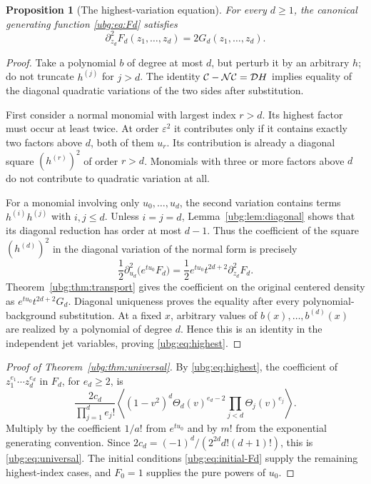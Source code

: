 \documentclass[11pt,letterpaper]{article}
\numberwithin{equation}{section}
\newtheorem{proposition}[theorem]{Proposition}
\theoremstyle{definition}\newtheorem{definition}[theorem]{Definition}
\theoremstyle{remark}\newtheorem{remark}[theorem]{Remark}
\newcommand{\D}{\mathcal D}\newcommand{\NF}{\mathcal N}\newcommand{\HF}{\mathcal H}
\newcommand{\av}[1]{\left\langle #1\right\rangle}
\begin{document}
\begin{proposition}[The highest-variation equation]
\label{ubg:prop:highest}
For every $d\ge1$, the canonical generating function
\eqref{ubg:eq:Fd} satisfies
\begin{equation}\label{ubg:eq:highest}
 \boxed{\displaystyle
 \partial_{z_d}^2F_d(z_1,\ldots,z_d)=2G_d(z_1,\ldots,z_d).}
\end{equation}
\end{proposition}
\begin{proof}
Take a polynomial $b$ of degree at most $d$, but perturb it by an
arbitrary $h$; do not truncate $h^{(j)}$ for $j>d$.
The identity $\CC-\NF\CC=\D H$ implies equality of the diagonal
quadratic variations of the two sides after substitution.

First consider a normal monomial with largest index $r>d$.
Its highest factor must occur at least twice. At order $\varepsilon^2$
it contributes only if it contains exactly two factors above $d$,
both of them $u_r$. Its contribution is already a diagonal square
$(h^{(r)})^2$ of order $r>d$. Monomials with three or more factors
above $d$ do not contribute to quadratic variation at all.

For a monomial involving only $u_0,\ldots,u_d$, the second variation
contains terms $h^{(i)}h^{(j)}$ with $i,j\le d$.
Unless $i=j=d$, Lemma~\ref{ubg:lem:diagonal} shows that its diagonal
reduction has order at most $d-1$. Thus the coefficient of the square
$(h^{(d)})^2$ in the diagonal variation of the normal form is precisely
\[
 \frac12\partial_{u_d}^2\bigl(e^{tu_0}F_d\bigr)
 =\frac12e^{tu_0}t^{2d+2}\partial_{z_d}^2F_d.
\]
Theorem~\ref{ubg:thm:transport} gives the coefficient on the original
centered density as $e^{tu_0}t^{2d+2}G_d$.
Diagonal uniqueness proves the equality after every polynomial-background
substitution. At a fixed $x$, arbitrary values of $b(x),\ldots,b^{(d)}(x)$
are realized by a polynomial of degree $d$. Hence this is an identity
in the independent jet variables, proving \eqref{ubg:eq:highest}.
\end{proof}

\begin{proof}[Proof of Theorem~\ref{ubg:thm:universal}]
By \eqref{ubg:eq:highest}, the coefficient of
$z_1^{e_1}\cdots z_d^{e_d}$ in $F_d$, for $e_d\ge2$, is
\[
 \frac{2c_d}{\prod_{j=1}^d e_j!}
 \av{(1-v^2)^d\Theta_d(v)^{e_d-2}
                         \prod_{j<d}\Theta_j(v)^{e_j}}.
\]
Multiply by the coefficient $1/a!$ from $e^{tu_0}$ and by $m!$ from
the exponential generating convention. Since
$2c_d=(-1)^d/(2^{2d}d!(d+1)!)$, this is \eqref{ubg:eq:universal}.
The initial conditions \eqref{ubg:eq:initial-Fd} supply the remaining
highest-index cases, and $F_0=1$ supplies the pure powers of $u_0$.
\end{proof}
\end{document}
